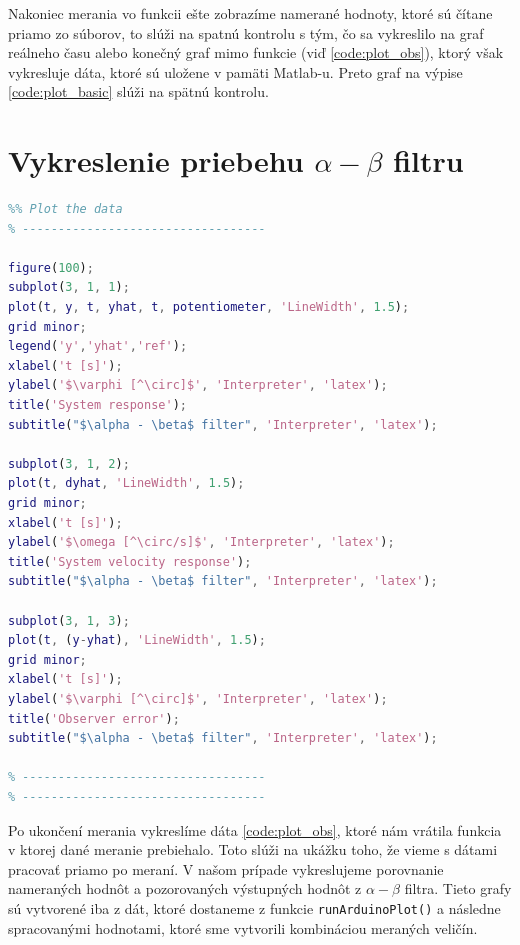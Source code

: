 \documentclass[a4paper, 10pt, ]{article}
\begin{document}
Nakoniec merania vo funkcii ešte zobrazíme namerané hodnoty, ktoré sú čítane priamo zo súborov, to slúži na spatnú kontrolu s tým, čo sa vykreslilo na graf reálneho času alebo konečný graf mimo funkcie (viď \ref{code:plot_obs}), ktorý však vykresluje dáta, ktoré sú uložene v pamäti Matlab-u. Preto graf na výpise \ref{code:plot_basic} slúži na spätnú kontrolu.

\section{Vykreslenie priebehu $\alpha-\beta$ filtru}
\begin{lstlisting}[caption=Vykreslenie priebehu a porovnania odhadu stavu pomocou $\alpha-\beta$ filtra., label={code:plot_obs}, language=Matlab]
% ----------------------------------
%% Plot the data
% ----------------------------------

figure(100);
subplot(3, 1, 1);
plot(t, y, t, yhat, t, potentiometer, 'LineWidth', 1.5);
grid minor;
legend('y','yhat','ref');
xlabel('t [s]');
ylabel('$\varphi [^\circ]$', 'Interpreter', 'latex');
title('System response');
subtitle("$\alpha - \beta$ filter", 'Interpreter', 'latex');

subplot(3, 1, 2);
plot(t, dyhat, 'LineWidth', 1.5);
grid minor;
xlabel('t [s]');
ylabel('$\omega [^\circ/s]$', 'Interpreter', 'latex');
title('System velocity response');
subtitle("$\alpha - \beta$ filter", 'Interpreter', 'latex');

subplot(3, 1, 3);
plot(t, (y-yhat), 'LineWidth', 1.5);
grid minor;
xlabel('t [s]');
ylabel('$\varphi [^\circ]$', 'Interpreter', 'latex');
title('Observer error');
subtitle("$\alpha - \beta$ filter", 'Interpreter', 'latex');

% ----------------------------------
% ----------------------------------
\end{lstlisting}

Po ukončení merania vykreslíme dáta \ref{code:plot_obs}, ktoré nám vrátila funkcia v ktorej dané meranie prebiehalo. Toto slúži na ukážku toho, že vieme s dátami pracovať priamo po meraní. V našom prípade vykreslujeme porovnanie nameraných hodnôt a pozorovaných výstupných hodnôt z $\alpha-\beta$ filtra. Tieto grafy sú vytvorené iba z dát, ktoré dostaneme z funkcie \texttt{runArduinoPlot()} a následne spracovanými hodnotami, ktoré sme vytvorili kombináciou meraných veličín.










\end{document}
